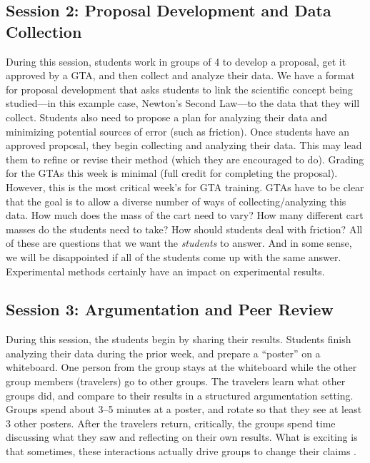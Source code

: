 \documentclass[aip, numerical, preprint]{revtex4-2}
\begin{document}
\subsection{Session 2: Proposal Development and Data Collection}
During this session, students work in groups of 4 to develop a proposal, get it approved by a GTA,
and then collect and analyze their data.  We have a format for proposal development that asks
students to link the scientific concept being studied---in this example case, Newton's Second
Law---to the data that they will collect.  Students also need to propose a plan for analyzing
their data and minimizing potential sources of error (such as friction).  Once students have an
approved proposal, they begin collecting and analyzing their data.  This may lead them to
refine or revise their method (which they are encouraged to do).  Grading for the GTAs this
week is minimal (full credit for completing the proposal).  However, this is the most critical
week's for GTA training.  GTAs have to be clear that the goal is to allow a diverse number of
ways of collecting/analyzing this data.  How much does the mass of the cart need to vary?  How
many different cart masses do the students need to take?  How should students deal with
friction? All of these are questions that we want the \textit{students} to answer.  And in some
sense, we will be disappointed if all of the students come up with the same answer.
Experimental methods certainly have an impact on experimental results.

\subsection{Session 3: Argumentation and Peer Review}
During this session, the students begin by sharing their results.  Students finish analyzing their
data during the prior week, and prepare a ``poster'' on a whiteboard.  One person from the
group stays at the whiteboard while the other group members (travelers) go to other groups.
The travelers learn what other groups did, and compare to their results in a structured
argumentation setting.  Groups spend about 3--5 minutes at a poster, and rotate so that they see
at least 3 other posters.  After the travelers return, critically, the groups spend time
discussing what they saw and reflecting on their own results.  What is exciting is that
sometimes, these interactions actually drive groups to change their claims \cite{Walker2019}.
\end{document}
